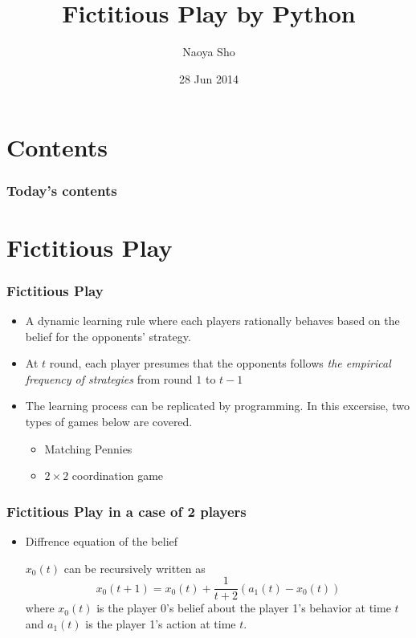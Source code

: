 \documentclass[dvipdfmx,fleqn]{beamer}
\title{Fictitious Play by Python}
\author{Naoya Sho}
\institute{Oyama Seminar, University of Tokyo}
\date{28 Jun 2014}
\begin{document}
\begin{frame}\frametitle{}
 \maketitle
\end{frame}

\section*{Contents}
\begin{frame}\frametitle{Today's contents}
 \tableofcontents
\end{frame}

\setcounter{framenumber}{0}

\section{Fictitious Play}
\begin{frame}
\frametitle{Fictitious Play}
\begin{itemize}\setlength{\parskip}{0.5em}
\item
A dynamic learning rule where each players rationally behaves based on the belief for the opponents' strategy.
\item
At $t$ round, each player presumes that the opponents follows \textsl{the empirical frequency of strategies} from round $1$ to $t-1$

\item
The learning process can be replicated by programming. In this excersise, two types of games below are covered.

 \begin{itemize}\setlength{\parskip}{0.5em}
 \item
 Matching Pennies
 \item
 $2\times2$ coordination game
 \end{itemize}

\end{itemize}
\end{frame}

\begin{frame}
\frametitle{Fictitious Play in a case of 2 players}
\begin{itemize}\setlength{\parskip}{0.5em}
\item
Diffrence equation of the belief

$x_0(t)$ can be recursively written as
\[
x_0(t+1)
= x_0(t) + \frac{1}{t+2} (a_1(t) - x_0(t))
\]
where $x_0(t)$ is the player 0's belief about the player 1's behavior at time $t$ and $a_1(t)$ is the player 1's action at time $t$.

\end{itemize}
\end{frame}
\end{document}
